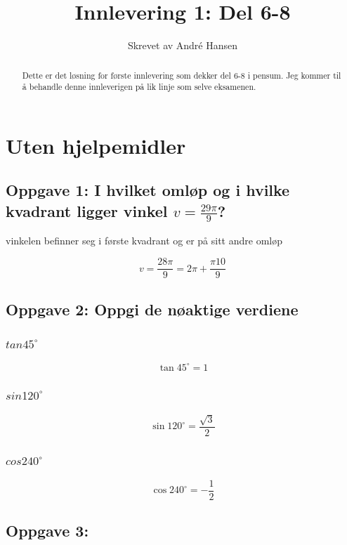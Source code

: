 \documentclass{article}
\title{Innlevering 1: Del 6-8}
\author{Skrevet av André Hansen}
\begin{document}
\maketitle

\begin{abstract}
Dette er det løsning for første innlevering som dekker del 6-8 i pensum. Jeg kommer til å behandle denne innleverigen på lik linje som selve eksamenen.
\end{abstract}

\section{Uten hjelpemidler}

\subsection{Oppgave 1: I hvilket omløp og i hvilke kvadrant ligger vinkel $v= \frac{29 \pi}{9}$?}

vinkelen befinner seg i første kvadrant og er på sitt andre omløp

$$v = \frac{28 \pi}{9} = 2 \pi + \frac{\pi 10}{9}$$

\subsection{Oppgave 2: Oppgi de nøaktige verdiene}

\subsubsection{$tan 45^{\circ}$}

$$\tan 45^{\circ} = 1$$

\subsubsection{$sin 120^{\circ}$}

$$\sin 120^{\circ} = \frac{\sqrt{3}}{2}$$

\subsubsection{$cos 240^{\circ}$}

$$\cos 240^{\circ} = -\frac{1}{2}$$

\subsection{Oppgave 3:}
\end{document}
